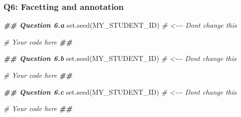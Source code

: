 \documentclass[]{article}
\newenvironment{Shaded}{\begin{snugshade}}{\end{snugshade}}
\newcommand{\CommentTok}[1]{\textcolor[rgb]{0.56,0.35,0.01}{\textit{#1}}}
\newcommand{\DocumentationTok}[1]{\textcolor[rgb]{0.56,0.35,0.01}{\textbf{\textit{#1}}}}
\newcommand{\FunctionTok}[1]{\textcolor[rgb]{0.00,0.00,0.00}{#1}}
\newcommand{\NormalTok}[1]{#1}
\begin{document}
\hypertarget{q6-facetting-and-annotation}{%
\subsubsection{Q6: Facetting and
annotation}\label{q6-facetting-and-annotation}}

\begin{Shaded}
\begin{Highlighting}[]
\DocumentationTok{\#\# Question 6.a}
\FunctionTok{set.seed}\NormalTok{(MY\_STUDENT\_ID) }\CommentTok{\# \textless{}{-}{-}{-} Don\textquotesingle{}t change this}

\CommentTok{\# Your code here}
\DocumentationTok{\#\#}
\end{Highlighting}
\end{Shaded}

\begin{Shaded}
\begin{Highlighting}[]
\DocumentationTok{\#\# Question 6.b}
\FunctionTok{set.seed}\NormalTok{(MY\_STUDENT\_ID) }\CommentTok{\# \textless{}{-}{-}{-} Don\textquotesingle{}t change this}

\CommentTok{\# Your code here}
\DocumentationTok{\#\#}
\end{Highlighting}
\end{Shaded}

\begin{Shaded}
\begin{Highlighting}[]
\DocumentationTok{\#\# Question 6.c}
\FunctionTok{set.seed}\NormalTok{(MY\_STUDENT\_ID) }\CommentTok{\# \textless{}{-}{-}{-} Don\textquotesingle{}t change this}

\CommentTok{\# Your code here}
\DocumentationTok{\#\#}
\end{Highlighting}
\end{Shaded}
\end{document}

